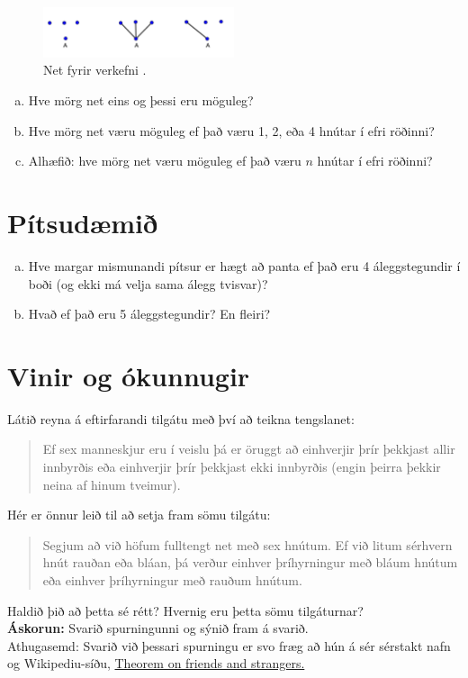 \documentclass[b5paper,12pt]{book}
\renewcommand*\thesection{\arabic{section}}
\begin{document}
\begin{figure}[h]
  \includegraphics[width=0.5\textwidth, center]{Myndir/1-3net.png}
  \caption*{Net fyrir verkefni \thesection{}.}
\end{figure}
\begin{enumerate}[(a)]
    \item Hve mörg net eins og þessi eru möguleg?
    \item Hve mörg net væru möguleg ef það væru 1, 2, eða 4 hnútar í efri röðinni?
    \item Alhæfið: hve mörg net væru möguleg ef það væru $n$ hnútar í efri röðinni?
\end{enumerate}

\section{Pítsudæmið}
\begin{enumerate}[(a)]
\item Hve margar mismunandi pítsur er hægt að panta ef það eru 4 áleggstegundir í boði (og ekki má velja sama álegg tvisvar)?
\item Hvað ef það eru 5 áleggstegundir? En fleiri?
\end{enumerate}

\section{Vinir og ókunnugir} 
Látið reyna á eftirfarandi tilgátu með því að teikna tengslanet:
\begin{quote}
Ef sex manneskjur eru í veislu þá er öruggt að einhverjir þrír þekkjast allir innbyrðis eða einhverjir þrír þekkjast ekki innbyrðis (engin þeirra þekkir neina af hinum tveimur).
\end{quote}
Hér er önnur leið til að setja fram sömu tilgátu:
\begin{quote}
Segjum að við höfum fulltengt net með sex hnútum. Ef við litum sérhvern hnút rauðan eða bláan, þá verður einhver þríhyrningur með bláum hnútum eða einhver þríhyrningur með rauðum hnútum.
\end{quote}
Haldið þið að þetta sé rétt? Hvernig eru þetta sömu tilgáturnar?\\
\textbf{Áskorun:} Svarið spurningunni og sýnið fram á svarið.\\
Athugasemd: Svarið við þessari spurningu er svo fræg að hún á sér sérstakt nafn og Wikipediu-síðu, \href {https://en.wikipedia.org/wiki/Theorem_on_friends_and_strangers} {Theorem on friends and strangers.} 
\end{document}
